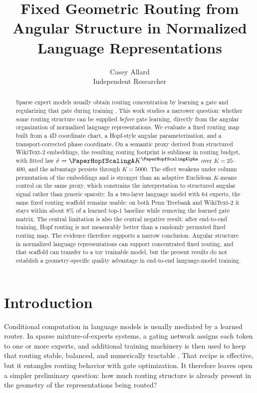 \documentclass[11pt,letterpaper]{article}
\title{\bfseries Fixed Geometric Routing from Angular Structure in Normalized Language Representations}
\author{Casey Allard\\Independent Researcher}
\date{}
\begin{document}
\maketitle

\begin{abstract}
Sparse expert models usually obtain routing concentration by learning a gate and regularizing that gate during training \citep{shazeer2017outrageously,lepikhin2021gshard,fedus2022switch,lewis2021base}. This work studies a narrower question: whether some routing structure can be supplied \emph{before} gate learning, directly from the angular organization of normalized language representations. We evaluate a fixed routing map built from a 4D coordinate chart, a Hopf-style angular parameterization, and a transport-corrected phase coordinate. On a semantic proxy derived from structured WikiText-2 embeddings, the resulting routing footprint is sublinear in routing budget, with fitted law $\hat e=\PaperHopfScalingA K^{\PaperHopfScalingAlpha}$ over $K=25$--$400$, and the advantage persists through $K=5000$. The effect weakens under column permutation of the embeddings and is stronger than an adaptive Euclidean $K$-means control on the same proxy, which constrains the interpretation to structured angular signal rather than generic sparsity. In a two-layer language model with 64 experts, the same fixed routing scaffold remains usable: on both Penn Treebank and WikiText-2 it stays within about $8\%$ of a learned top-1 baseline while removing the learned gate matrix. The central limitation is also the central negative result: after end-to-end training, Hopf routing is not measurably better than a randomly permuted fixed routing map. The evidence therefore supports a narrow conclusion. Angular structure in normalized language representations can support concentrated fixed routing, and that scaffold can transfer to a toy trainable model, but the present results do not establish a geometry-specific quality advantage in end-to-end language-model training.
\end{abstract}

\section{Introduction}
Conditional computation in language models is usually mediated by a learned router. In sparse mixture-of-experts systems, a gating network assigns each token to one or more experts, and additional training machinery is then used to keep that routing stable, balanced, and numerically tractable \citep{shazeer2017outrageously,lepikhin2021gshard,fedus2022switch,lewis2021base}. That recipe is effective, but it entangles routing behavior with gate optimization. It therefore leaves open a simpler preliminary question: how much routing structure is already present in the geometry of the representations being routed?
\end{document}

